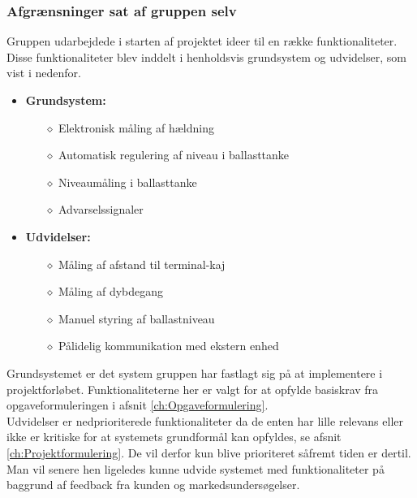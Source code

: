 \subsubsection{Afgrænsninger sat af gruppen selv}
Gruppen udarbejdede i starten af projektet ideer til en række funktionaliteter. Disse funktionaliteter blev inddelt i henholdsvis grundsystem og udvidelser, som vist i nedenfor.
\begin{itemize}
\item \textbf{Grundsystem:}
\begin{itemize}
\item[$\diamond$] Elektronisk måling af hældning
\item[$\diamond$] Automatisk regulering af niveau i ballasttanke
\item[$\diamond$] Niveaumåling i ballasttanke
\item[$\diamond$] Advarselssignaler
\end{itemize}
\item \textbf{Udvidelser:}
\begin{itemize}
\item[$\diamond$] Måling af afstand til terminal-kaj
\item[$\diamond$] Måling af dybdegang
\item[$\diamond$] Manuel styring af ballastniveau
\item[$\diamond$] Pålidelig kommunikation med ekstern enhed
\end{itemize}
\end{itemize}

Grundsystemet er det system gruppen har fastlagt sig på at implementere i projektforløbet. Funktionaliteterne her er valgt for at opfylde basiskrav fra opgaveformuleringen i afsnit \ref{ch:Opgaveformulering}.\\
Udvidelser er nedprioriterede funktionaliteter da de enten har lille relevans eller ikke er kritiske for at systemets grundformål kan opfyldes, se afsnit \ref{ch:Projektformulering}. De vil derfor kun blive prioriteret såfremt tiden er dertil. \\

Man vil senere hen ligeledes kunne udvide systemet med funktionaliteter på baggrund af feedback fra kunden og markedsundersøgelser.

